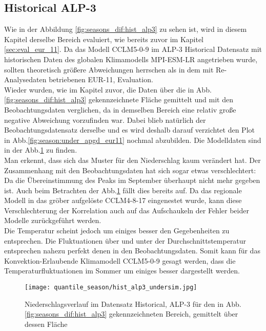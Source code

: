 \subsection{Historical ALP-3}
Wie in der Abbildung \ref{fig:seasons_dif:hist_alp3} zu sehen ist, wird in diesem Kapitel derselbe Bereich evaluiert, wie bereits zuvor im Kapitel \ref{sec:eval_eur_11}. Da das Modell CCLM5-0-9 im ALP-3 Historical Datensatz mit historischen Daten des globalen Klimamodells MPI-ESM-LR angetrieben wurde, sollten theoretisch größere Abweichungen herrschen als in dem mit Re-Analysedaten betriebenen EUR-11, Evaluation.\\
Wieder wurden, wie im Kapitel zuvor, die Daten über die in Abb.\ref{fig:seasons_dif:hist_alp3} gekennzeichnete Fläche gemittelt und mit den Beobachtungsdaten verglichen, da in demselben Bereich eine relativ große negative Abweichung vorzufinden war. Dabei blieb natürlich der Beobachtungsdatensatz derselbe und es wird deshalb darauf verzichtet den Plot in Abb.\ref{fig:season:under_apgd_eur11} nochmal abzubilden. Die Modelldaten sind in der Abb.\ref{fig:season:under_hist_alp3} zu finden.\\
Man erkennt, dass sich das Muster für den Niederschlag kaum verändert hat. Der Zusammenhang mit den Beobachtungsdaten hat sich sogar etwas verschlechtert: Da die Übereinstimmung des Peaks im September überhaupt nicht mehr gegeben ist. Auch beim Betrachten der Abb.\ref{fig:season:under_hist_alp3} fällt dies bereits auf. Da das regionale Modell in das gröber aufgelöste CCLM4-8-17 eingenestet wurde, kann diese Verschlechterung der Korrelation auch auf das Aufschaukeln der Fehler beider Modelle zurückgeführt werden.\\
Die Temperatur scheint jedoch um einiges besser den Gegebenheiten zu entsprechen. Die Fluktuationen über und unter der Durchschnittstemperatur entsprechen nahezu perfekt denen in den Beobachtungsdaten. Somit kann für das Konvektion-Erlaubende Klimamodell CCLM5-0-9 gesagt werden, dass die Temperaturfluktuationen im Sommer um einiges besser dargestellt werden.
\begin{figure}[h!]
	\texttt{[image: quantile\_season/hist\_alp3\_undersim.jpg]}
	\caption{Niederschlagsverlauf im Datensatz Historical, ALP-3 für den in Abb.\ref{fig:seasons_dif:hist_alp3} gekennzeichneten Bereich, gemittelt über dessen Fläche}
	\label{fig:season:under_hist_alp3}
\end{figure}
